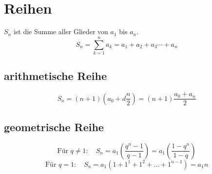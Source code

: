 \section{Reihen}
$S_n$ ist die Summe aller Glieder von $a_1$ bis $a_n$. 
\[ \boxed{S_n = \sum_{k=1}^{n} a_k = a_1 + a_2 + a_3 \cdots + a_n} \]

\subsection{arithmetische Reihe}
\[ \boxed{S_n = (n + 1)(a_0 + d \frac{n}{2}) = (n + 1) \frac{a_0 + a_n}{2}} \]

\subsection{geometrische Reihe}
\[ \boxed{\text{Für } q \neq 1: \quad S_n = a_1 (  \frac{q^n - 1}{q - 1} ) = a_1 (  \frac{1 - q^n}{1 - q} )} \]
\[ \boxed{\text{Für } q = 1: \quad S_n = a_1 (1+1^1 + 1^2 + \ldots + 1^{n-1}) = a_1 n} \]